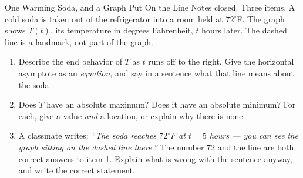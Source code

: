 \documentclass[10pt]{article}
\begin{document}

\vspace{0.15in}

\begin{notesbox}{One Warming Soda, and a Graph Put On the Line}
\small
Notes closed. Three items. A cold soda is taken out of the refrigerator into a room held at
$72^\circ$F. The graph shows $T(t)$, its temperature in degrees Fahrenheit, $t$ hours later. The
dashed line is a landmark, not part of the graph.

\begin{center}
\end{center}

\begin{enumerate}[leftmargin=1.6em, itemsep=7pt, topsep=4pt]

\item Describe the end behavior of $T$ as $t$ runs off to the right. Give the horizontal asymptote as
an \emph{equation}, and say in a sentence what that line means about the soda.


\item Does $T$ have an absolute maximum? Does it have an absolute minimum? For each, give a value
\emph{and} a location, or explain why there is none.


\item A classmate writes: \emph{``The soda reaches $72^\circ$F at $t=5$ hours --- you can see the
graph sitting on the dashed line there.''} The number $72$ and the line are both correct answers to
item 1. Explain what is wrong with the sentence anyway, and write the correct statement.


\end{enumerate}
\end{notesbox}
\end{document}
